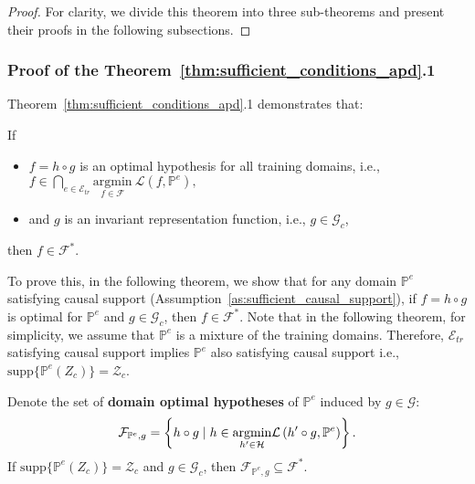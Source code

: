 \begin{proof}
For clarity, we divide this theorem into three sub-theorems and present their proofs in the following subsections.
\end{proof}

\subsubsection{Proof of the Theorem~\ref{thm:sufficient_conditions_apd}.1}


Theorem~\ref{thm:sufficient_conditions_apd}.1 demonstrates that:

If 
\begin{itemize}
    \item \( f = h \circ g \) is an optimal hypothesis for all training domains, i.e., $f \in \bigcap_{{e} \in \mathcal{E}_{tr}} \underset{f \in \mathcal{F}}{\text{argmin}} \ \mathcal{L}(f, \mathbb{P}^{e}),$
    \item and \( g \) is an invariant representation function, i.e., \( g \in \mathcal{G}_c \),
\end{itemize}
then \( f \in \mathcal{F}^* \).


To prove this, in the following theorem, we show that for any domain \( \mathbb{P}^e \) satisfying causal support (Assumption~\ref{as:sufficient_causal_support}), if \( f = h \circ g \) is optimal for \( \mathbb{P}^e \) and \( g \in \mathcal{G}_c \), then \( f \in \mathcal{F}^* \). Note that in the following theorem, for simplicity, we assume that
$\mathbb{P}^e$ is a mixture of the training domains. Therefore, $\mathcal{E}_{tr}$ satisfying causal support implies \( \mathbb{P}^e \) also satisfying causal support i.e., $\text{supp}\{\mathbb{P}^e(Z_c)\}=\mathcal{Z}_c$.


\begin{theorem} Denote the set of \textbf{domain optimal hypotheses} of $\mathbb{P}^e$ induced by $g\in \mathcal{G}$: 
    \begin{equation*}
        \mathcal{F}_{\mathbb{P}^e,g}=\left \{h\circ g \mid h\in\underset{h'\in \mathcal{H}}{\rm{argmin }} \mathcal{L}\left ( h'\circ g, {\mathbb{P}^{e}} \right )  \right \}.
    \end{equation*} 
If $\text{supp}\{\mathbb{P}^e(Z_c)\}=\mathcal{Z}_c$ and $g\in \mathcal{G}_c$, then $\mathcal{F}_{\mathbb{P}^e,g}  \subseteq \mathcal{F}^{*}$. 
\label{thm:single_generalization_apd}
\end{theorem}


